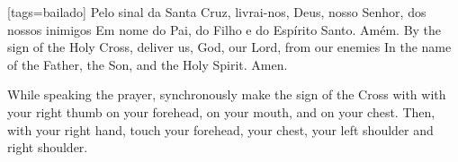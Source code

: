 {\begin{songs}{}
    [tags={bailado}]
      \beginverse
        Pelo sinal da Santa Cruz,
        livrai-nos, Deus, nosso Senhor,
        dos nossos inimigos
        \parspace
        Em nome do Pai,
        do Filho e
        do Espírito Santo.
        \parspace
        Amém.
      \endverse
      \beginverse
        By the sign of the Holy Cross,
        deliver us, God, our Lord,
        from our enemies
        \parspace
        In the name of the Father,
        the Son, and
        the Holy Spirit.
        \parspace
        Amen.
      \endverse
      \begin{note}
        While speaking the prayer, synchronously make
        the sign of the Cross with with your right thumb
        on your forehead,
        on your mouth, and
        on your chest.
        \parspace
        Then, with your right hand, touch
        your forehead,
        your chest,
        your left shoulder and right shoulder.
      \end{note}
    \endsong



\end{songs}}
